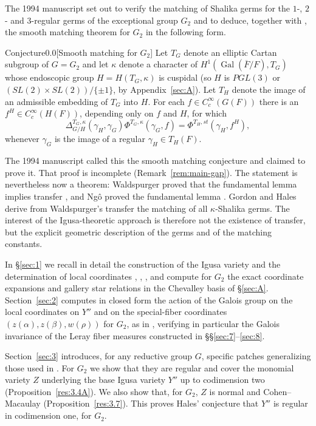 \documentclass[12pt,letterpaper]{amsart}
\theoremstyle{plain}
\theoremstyle{definition}
\theoremstyle{remark}
\theoremstyle{definition}
\newcommand{\ovF}{\overline{F}}
\DeclareMathOperator{\Gal}{Gal}
\begin{document}
The 1994 manuscript set out to verify the matching of Shalika germs
for the $1$-, $2$- and $3$-regular germs of the
exceptional group $G_2$ and to deduce, together with \cite{She89}, the
smooth matching theorem for $G_2$ in the following form.

\begin{res}{Conjecture}{0.0}[Smooth matching for $G_2$]\label{res:smooth}
Let $T_G$ denote an elliptic Cartan subgroup of $G=G_2$ and let $\kappa$
denote a character of $H^1(\Gal(\ovF/F),T_G)$ whose endoscopic group
$H=H(T_G,\kappa)$ is cuspidal (so $H$ is $PGL(3)$ or
$(SL(2)\times SL(2))/\{\pm 1\}$, by Appendix~\ref{sec:A}).
Let $T_H$ denote the image of an admissible embedding of $T_G$ into $H$.
For each $f\in C_c^\infty(G(F))$ there is an $f^H\in C_c^\infty(H(F))$,
depending only on $f$ and $H$, for which
\[
\Delta_{G/H}^{T_G,\kappa}(\gamma_H,\gamma_G)
\Phi^{T_G,\kappa}(\gamma_G,f)
=\Phi^{T_H,st}(\gamma_H,f^H),
\]
whenever $\gamma_G$ is the image of a regular $\gamma_H\in T_H(F)$.
\end{res}

\begin{rem26}\label{rem:transfer-known}
The 1994 manuscript called this the smooth matching conjecture and claimed to
prove it. That proof is incomplete (Remark~\ref{rem:main-gap}). The statement
is nevertheless now a theorem: Waldspurger proved that the fundamental lemma
implies transfer \cite{Wa97}, and Ng\^o proved the fundamental lemma
\cite{Ng10}. Gordon and Hales \cite{GH16} derive from Waldspurger's transfer
the matching of all $\kappa$-Shalika germs. The interest of the Igusa-theoretic approach is therefore not
the existence of transfer, but the explicit geometric description of the
germs and of the matching constants.
\end{rem26}

\medskip
In \S\ref{sec:1} we recall
in detail the construction of the Igusa variety and the
determination of local coordinates \cite{La83}, \cite{Ha92a}, \cite{Ha89},
and compute for $G_2$ the exact coordinate expansions and gallery star
relations in the Chevalley basis of \S\ref{sec:A}.
Section~\ref{sec:2} computes in closed form the action of the
Galois group on the local coordinates on $Y''$ and on the special-fiber
coordinates $(z(\alpha),z(\beta),w(\rho))$ for $G_2$, as in \cite{Ha89},
verifying in particular the Galois invariance of the Leray fiber measures
constructed in \S\S\ref{sec:7}--\ref{sec:8}.

Section~\ref{sec:3} introduces, for any reductive group $G$,
specific patches generalizing those used in \cite{Ha89}.
For $G_2$ we show that they are regular and cover the monomial variety $Z$
underlying the base Igusa variety $Y''$ up to codimension two
(Proposition~\ref{res:3.4A}). We also show that, for $G_2$, $Z$ is normal and
Cohen--Macaulay (Proposition~\ref{res:3.7}). This proves Hales'
conjecture \cite{Ha92a} that $Y''$ is regular in codimension one, for $G_2$.
\end{document}
